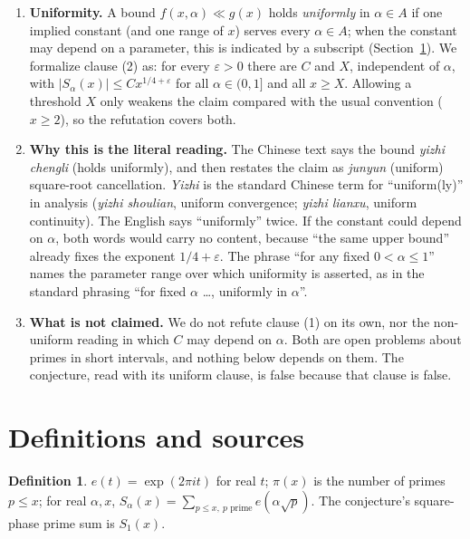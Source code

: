 \documentclass[11pt]{article}
\theoremstyle{definition}
\newtheorem{definition}[theorem]{Definition}
\theoremstyle{remark}
\renewcommand{\_}{\oldus\allowbreak}
\begin{document}
\begin{enumerate}[label=(\alph*)]
\item \textbf{Uniformity.} A bound $f(x,\alpha) \ll g(x)$ holds \emph{uniformly} in $\alpha \in A$ if
  one implied constant (and one range of $x$) serves every $\alpha \in A$; when the constant may depend
  on a parameter, this is indicated by a subscript (Section~\ref{sec:sources}). We formalize clause (2)
  as: for every $\varepsilon > 0$ there are $C$ and $X$, independent of $\alpha$, with
  $|S_\alpha(x)| \le C x^{1/4+\varepsilon}$ for all $\alpha\in(0,1]$ and all $x \ge X$. Allowing a
  threshold $X$ only weakens the claim compared with the usual convention ($x\ge 2$), so the refutation
  covers both.
\item \textbf{Why this is the literal reading.} The Chinese text says the bound \emph{yizhi chengli}
  (holds uniformly), and then restates the claim as \emph{junyun} (uniform) square-root cancellation.
  \emph{Yizhi} is the standard Chinese term for ``uniform(ly)'' in analysis (\emph{yizhi shoulian},
  uniform convergence; \emph{yizhi lianxu}, uniform continuity). The English says ``uniformly'' twice.
  If the constant could depend on $\alpha$, both words would carry no content, because ``the same upper
  bound'' already fixes the exponent $1/4+\varepsilon$. The phrase ``for any fixed $0<\alpha\le1$''
  names the parameter range over which uniformity is asserted, as in the standard phrasing ``for fixed
  $\alpha$ \dots, uniformly in $\alpha$''.
\item \textbf{What is not claimed.} We do not refute clause (1) on its own, nor the non-uniform
  reading in which $C$ may depend on $\alpha$. Both are open problems about primes in short intervals,
  and nothing below depends on them. The conjecture, read with its uniform clause, is false because
  that clause is false.
\end{enumerate}

\section{Definitions and sources}\label{sec:sources}

\begin{definition}
$e(t) = \exp(2\pi i t)$ for real $t$; $\pi(x)$ is the number of primes $p\le x$; for real $\alpha, x$,
$S_\alpha(x) = \sum_{p\le x,\ p \text{ prime}} e(\alpha\sqrt p)$. The conjecture's square-phase prime
sum is $S_1(x)$.
\end{definition}
\end{document}
